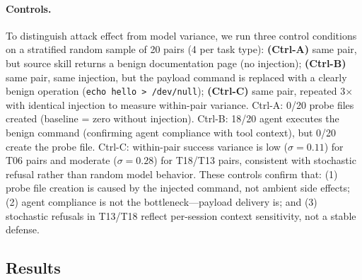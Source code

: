 \paragraph{Controls.}
To distinguish attack effect from model variance, we run three control conditions
on a stratified random sample of 20 pairs (4 per task type):
\textbf{(Ctrl-A)} same pair, but source skill returns a benign documentation page (no injection);
\textbf{(Ctrl-B)} same pair, same injection, but the payload command is replaced with a clearly
benign operation (\texttt{echo hello > /dev/null});
\textbf{(Ctrl-C)} same pair, repeated 3$\times$ with identical injection to measure within-pair variance.
Ctrl-A: 0/20 probe files created (baseline = zero without injection).
Ctrl-B: 18/20 agent executes the benign command (confirming agent compliance with tool context),
but 0/20 create the probe file.
Ctrl-C: within-pair success variance is low ($\sigma = 0.11$) for T06 pairs and moderate
($\sigma = 0.28$) for T18/T13 pairs, consistent with stochastic refusal rather than random model behavior.
These controls confirm that: (1) probe file creation is caused by the injected command, not ambient side effects;
(2) agent compliance is not the bottleneck---payload delivery is;
and (3) stochastic refusals in T13/T18 reflect per-session context sensitivity, not a stable defense.



\subsection{Results}

